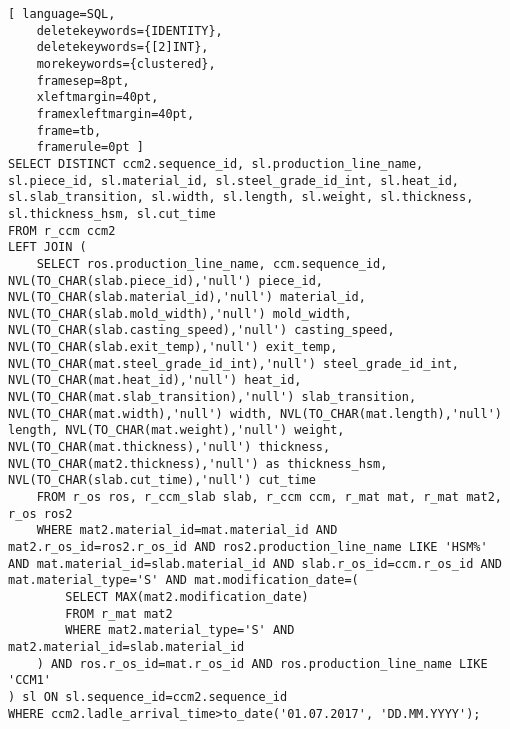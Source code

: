 \documentclass{article}
\begin{document}
\begin{lstlisting}[ language=SQL,
	deletekeywords={IDENTITY},
	deletekeywords={[2]INT},
	morekeywords={clustered},
	framesep=8pt,
	xleftmargin=40pt,
	framexleftmargin=40pt,
	frame=tb,
	framerule=0pt ]
SELECT DISTINCT ccm2.sequence_id, sl.production_line_name, sl.piece_id, sl.material_id, sl.steel_grade_id_int, sl.heat_id, sl.slab_transition, sl.width, sl.length, sl.weight, sl.thickness, sl.thickness_hsm, sl.cut_time
FROM r_ccm ccm2 
LEFT JOIN (
	SELECT ros.production_line_name, ccm.sequence_id, NVL(TO_CHAR(slab.piece_id),'null') piece_id, NVL(TO_CHAR(slab.material_id),'null') material_id, NVL(TO_CHAR(slab.mold_width),'null') mold_width, NVL(TO_CHAR(slab.casting_speed),'null') casting_speed, NVL(TO_CHAR(slab.exit_temp),'null') exit_temp, NVL(TO_CHAR(mat.steel_grade_id_int),'null') steel_grade_id_int, NVL(TO_CHAR(mat.heat_id),'null') heat_id, NVL(TO_CHAR(mat.slab_transition),'null') slab_transition, NVL(TO_CHAR(mat.width),'null') width, NVL(TO_CHAR(mat.length),'null') length, NVL(TO_CHAR(mat.weight),'null') weight, NVL(TO_CHAR(mat.thickness),'null') thickness, NVL(TO_CHAR(mat2.thickness),'null') as thickness_hsm, NVL(TO_CHAR(slab.cut_time),'null') cut_time 
	FROM r_os ros, r_ccm_slab slab, r_ccm ccm, r_mat mat, r_mat mat2, r_os ros2 
	WHERE mat2.material_id=mat.material_id AND mat2.r_os_id=ros2.r_os_id AND ros2.production_line_name LIKE 'HSM%' AND mat.material_id=slab.material_id AND slab.r_os_id=ccm.r_os_id AND mat.material_type='S' AND mat.modification_date=(
		SELECT MAX(mat2.modification_date) 
		FROM r_mat mat2 
		WHERE mat2.material_type='S' AND mat2.material_id=slab.material_id
	) AND ros.r_os_id=mat.r_os_id AND ros.production_line_name LIKE 'CCM1'
) sl ON sl.sequence_id=ccm2.sequence_id
WHERE ccm2.ladle_arrival_time>to_date('01.07.2017', 'DD.MM.YYYY');
\end{lstlisting}
\end{document}

